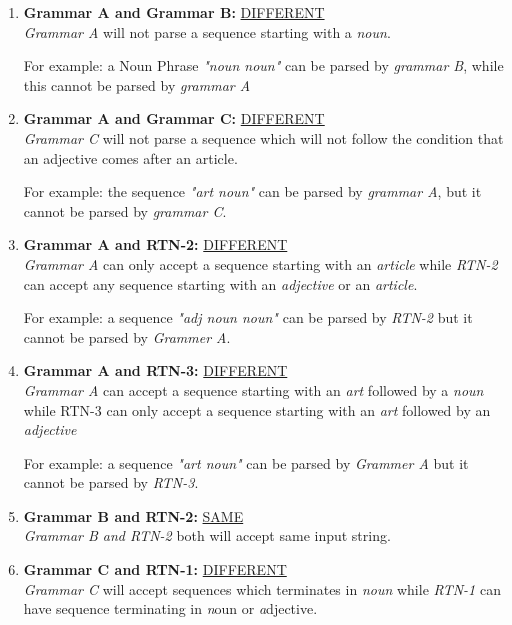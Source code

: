 \documentclass[11pt]{article}
\begin{document}
\begin{enumerate}

\item \textbf{Grammar A and Grammar B:} \underline {DIFFERENT}
\\ \textit{Grammar A} will not parse a sequence starting with a \textit{noun}. 

For example: a Noun Phrase \textit{"noun noun"} can be parsed by \emph{grammar B}, while this cannot be parsed by \emph{grammar A}

\item \textbf{Grammar A and Grammar C:} \underline {DIFFERENT}
\\ \textit{Grammar C} will not parse a sequence which will not follow the condition that an adjective comes after an article.

For example: the sequence \textit{"art noun"} can be parsed by \emph{grammar A}, but it cannot be  parsed by \emph{grammar C}.

\item \textbf{Grammar A and RTN-2:} \underline {DIFFERENT}
\\ \textit{Grammar A} can only accept a sequence starting with an \textit{article} while \textit{RTN-2} can accept any sequence starting with an \textit{adjective} or an \textit{article}.

For example: a sequence \textit{"adj noun noun"} can be parsed by \textit{RTN-2} but it cannot be parsed by \textit{Grammer A}.

\item \textbf{Grammar A and RTN-3:} \underline {DIFFERENT}
\\ \textit{Grammar A} can  accept a sequence starting with an \textit{art} followed by a \textit{noun} while {RTN-3} can only accept a sequence starting with an \textit{art} followed by an \textit{adjective}

For example: a sequence \textit{"art noun"} can be parsed by \textit{Grammer A} but it cannot be parsed by \textit{RTN-3}.

\item \textbf{Grammar B and RTN-2:} \underline {SAME}
\\\textit{Grammar B and RTN-2} both will accept same input string.

\item \textbf{Grammar C and RTN-1:} \underline {DIFFERENT}
\\ \textit{Grammar C}  will accept sequences which terminates in \textit{noun} while \textit{RTN-1} can have sequence terminating in \textit noun or \textit adjective.


\end{enumerate}
\end{document}
